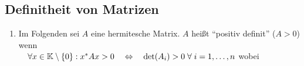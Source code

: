 \subsection{Definitheit von Matrizen}
\begin{enumerate}
  \item Im Folgenden sei $A$ eine hermitesche Matrix. $A$ heißt "`positiv definit"' ($A > 0$) wenn \\
  $\quad \forall x \in \mathbb K \setminus \{0\}: x^* A x > 0 \quad \Leftrightarrow \quad
  \det(A_i) > 0 \; \forall \; i = 1, \dots , n$ wobei
\end{enumerate}
